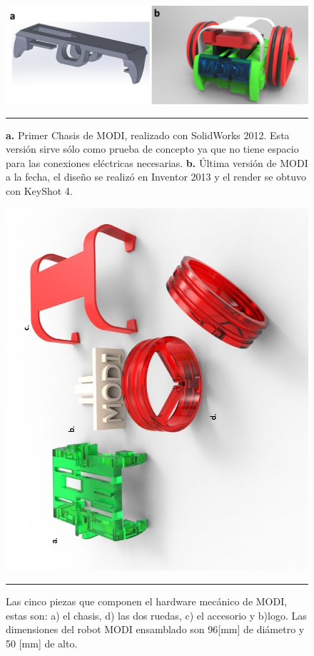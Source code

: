 \begin{figure}[htbp]
	\centering
		\includegraphics[width=\textwidth]{./Figures/MODI/compRender.png}
		\rule{35em}{0.5pt}
	\caption[Comparación entre el primer render realizado y el último]{\textbf{ a.} Primer Chasis de MODI, realizado con SolidWorks 2012. Esta versión sirve sólo como prueba de concepto ya que no tiene espacio para las conexiones eléctricas necesarias.\textbf{ b.} Última versión de MODI a la fecha, el diseño se realizó en Inventor 2013 y el render se obtuvo con KeyShot 4.}
	\label{fig:compRender}
\end{figure}	

\begin{figure}[htbp]
	\centering
		\includegraphics[width=\textwidth]{./Figures/MODI/piezas.jpg}
		\rule{35em}{0.5pt}
	\caption[Piezas 3D]{Las cinco piezas que componen el hardware mecánico de MODI, estas son: a) el chasis, d) las dos ruedas, c) el accesorio y b)logo. Las dimensiones del robot MODI ensamblado son 96[mm] de diámetro y 50 [mm] de alto.}
	\label{fig:Render Piezas 3D}
\end{figure}

